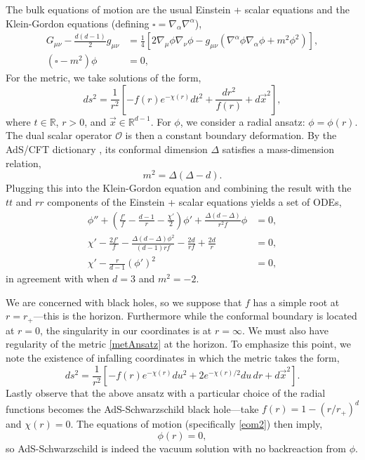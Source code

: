 \documentclass[12pt,a4paper]{article}
\begin{document}
The bulk equations of motion are the usual Einstein + scalar equations and the Klein-Gordon equations (defining $\square = \nabla_\alpha \nabla^\alpha$),
\begin{align}
G_{\mu\nu} - \frac{d(d-1)}{2}g_{\mu\nu} &= \frac{1}{4}\left[2\nabla_\mu \phi \nabla_\nu \phi - g_{\mu\nu}\left(\nabla^\alpha \phi \nabla_\alpha \phi + m^2\phi^2\right)\right],\\
(\square - m^2)\phi &= 0,
\end{align}
For the metric, we take solutions of the form,
\begin{equation}
ds^2 = \frac{1}{r^2}\left[-f(r)e^{-\chi(r)} dt^2 + \frac{dr^2}{f(r)} + d\vec{x}^2\right],\label{metAnsatz}
\end{equation}
where $t \in \mathbb{R}$, $r > 0$, and $\vec{x} \in \mathbb{R}^{d-1}$. For $\phi$, we consider a radial ansatz: $\phi = \phi(r)$. The dual scalar operator $\mathcal{O}$ is then a constant boundary deformation. By the AdS/CFT dictionary \cite{Aharony:1999ti}, its conformal dimension $\Delta$ satisfies a mass-dimension relation,
\begin{equation}
m^2 = \Delta(\Delta - d).\label{massdimension}
\end{equation}
Plugging this into the Klein-Gordon equation and combining the result with the $tt$ and $rr$ components of the Einstein + scalar equations yields a set of ODEs,
\begin{align}
\phi'' + \left(\frac{f'}{f} - \frac{d-1}{r} - \frac{\chi'}{2}\right)\phi' + \frac{\Delta(d-\Delta)}{r^2 f}\phi& = 0,\label{eom1}\\
\chi' - \frac{2f'}{f} - \frac{\Delta(d-\Delta)\phi^2}{(d-1)rf} - \frac{2d}{rf} + \frac{2d}{r} &= 0,\label{eom2}\\
\chi' - \frac{r}{d-1}\left(\phi'\right)^2 &= 0,\label{eom3}
\end{align}
in agreement with \cite{Frenkel:2020ysx} when $d = 3$ and $m^2 = -2$.

We are concerned with black holes, so we suppose that $f$ has a simple root at $r = r_+$---this is the horizon. Furthermore while the conformal boundary is located at $r = 0$, the singularity in our coordinates is at $r = \infty$. We must also have regularity of the metric \eqref{metAnsatz} at the horizon. To emphasize this point, we note the existence of infalling coordinates in which the metric takes the form,
\begin{equation}
ds^2 = \frac{1}{r^2}\left[-f(r) e^{-\chi(r)} du^2 + 2e^{-\chi(r)/2} du\,dr + d\vec{x}^2\right].
\end{equation}
Lastly observe that the above ansatz with a particular choice of the radial functions becomes the AdS-Schwarzschild black hole---take $f(r) = 1-(r/r_+)^{d}$ and $\chi(r) = 0$. The equations of motion (specifically \eqref{eom2}) then imply,
\begin{equation}
\phi(r) = 0,
\end{equation}
so AdS-Schwarzschild is indeed the vacuum solution with no backreaction from $\phi$.
\end{document}
